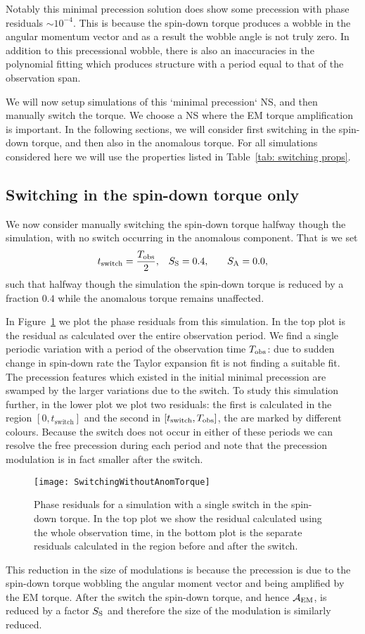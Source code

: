 \documentclass[../full_thesis/full_thesis.tex]{subfiles}
\begin{document}
Notably this minimal precession solution does show some precession with phase
residuals $\sim 10^{-4}$. This is because the spin-down torque produces a wobble
in the angular momentum vector and as a result the wobble angle is not truly
zero. In addition to this precessional wobble, there is also an inaccuracies
in the polynomial fitting which produces structure with a period equal to that
of the observation span.

We will now setup simulations of this `minimal precession` NS, and then
manually switch the torque. We choose a NS where the EM torque amplification is
important.  In the following sections, we will consider first switching in the
spin-down torque, and then also in the anomalous torque. For all simulations
considered here we will use the properties listed in Table~\ref{tab: switching
props}.

\subsection{Switching in the spin-down torque only}
We now consider manually switching the spin-down torque halfway though the
simulation, with no switch occurring in the anomalous component.
That is we set
\begin{align}
    t_{\mathrm{switch}} = \frac{T_{\textrm{obs}}}{2}, &&& S_{\mathrm{S}} = 0.4, &&& S_{\mathrm{A}} = 0.0,
\end{align}
such that halfway though the simulation the spin-down torque is reduced by a
fraction $0.4$ while the anomalous torque remains unaffected.

In Figure~\ref{fig: switching without anom} we plot the phase residuals from
this simulation. In the top plot is the residual as calculated over the entire
observation period. We find a single periodic variation with a period of the
observation time $T_{\textrm{obs}}$: due to sudden change in spin-down rate the Taylor
expansion fit is not finding a suitable fit. The precession features which existed
in the initial minimal precession are swamped by the larger variations due to
the switch. To study this simulation further,
in the lower plot we plot two residuals: the first is calculated
in the region $[0, t_{\mathrm{switch}}]$ and the second in $[t_{\mathrm{switch}}, T_{\textrm{obs}}]$,
the are marked by different colours.
Because the switch does not occur in either of these periods we can resolve the
free precession during each period and note that the precession modulation is
in fact smaller after the switch.
\begin{figure}[htb]
\texttt{[image: SwitchingWithoutAnomTorque]}
\caption{Phase residuals for a simulation with a single switch in the spin-down
torque. In the top plot we show the residual calculated using the whole observation
time, in the bottom plot is the separate residuals calculated in the region before
and after the switch.}
\label{fig: switching without anom}
\end{figure}
This reduction in the size of modulations is because the precession is due to
the spin-down torque wobbling the angular moment vector and being amplified by
the EM torque. After the switch the spin-down torque, and hence $\mathcal{A}_{\mathrm{EM}}$, is
reduced by a factor $S_{\mathrm{S}}$ and therefore the size of the modulation is similarly
reduced.
\end{document}
